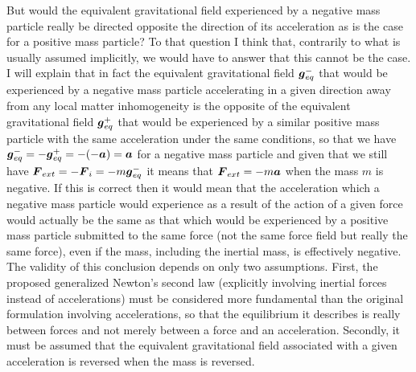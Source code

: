 \documentclass[notitlepage,12pt]{report}
\newcommand{\bm}[1]{\mbox{\boldmath $#1$}}
\begin{document}
But would the equivalent gravitational field experienced by a negative mass particle really be directed opposite the direction of its acceleration as is the case for a positive mass particle? To that question I think that, contrarily to what is usually assumed implicitly, we would have to answer that this cannot be the case. I will explain that in fact the equivalent gravitational field $\bm{g}_{eq}^-$ that would be experienced by a negative mass particle accelerating in a given direction away from any local matter inhomogeneity is the opposite of the equivalent gravitational field  $\bm{g}_{eq}^+$ that would be experienced by a similar positive mass particle with the same acceleration under the same conditions, so that we have $\bm{g}_{eq}^-=-\bm{g}_{eq}^+=-(-\bm{a})=\bm{a}$ for a negative mass particle and given that we still have $\bm{F}_{ext}=-\bm{F}_i=-m\bm{g}_{eq}^-$ it means that $\bm{F}_{ext}=-m\bm{a}$ when the mass $m$ is negative. If this is correct then it would mean that the acceleration which a negative mass particle would experience as a result of the action of a given force would actually be the same as that which would be experienced by a positive mass particle submitted to the same force (not the same force field but really the same force), even if the mass, including the inertial mass, is effectively negative. The validity of this conclusion depends on only two assumptions. First, the proposed generalized Newton's second law (explicitly involving inertial forces instead of accelerations) must be considered more fundamental than the original formulation involving accelerations, so that the equilibrium it describes is really between forces and not merely between a force and an acceleration. Secondly, it must be assumed that the equivalent gravitational field associated with a given acceleration is reversed when the mass is reversed.
\end{document}
